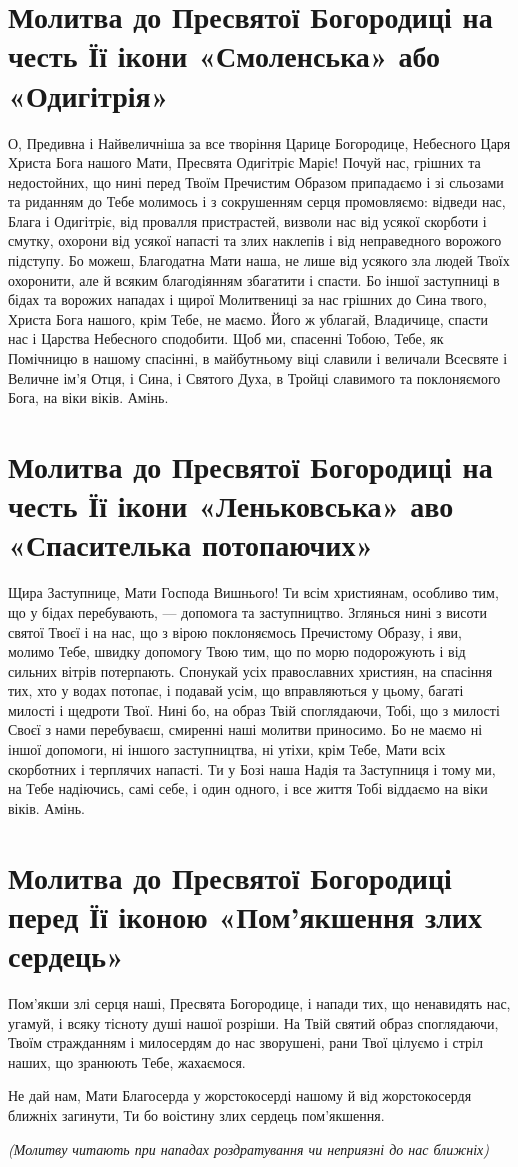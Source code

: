 \documentclass[chapters.tex]{subfiles}
\begin{document}
\section{Молитва до Пресвятої Богородиці на честь Її ікони «Смоленська» або «Одигітрія»}
О, Предивна і Найвеличніша за все творіння Царице Богородице, Небесного Царя Христа Бога нашого Мати, Пресвята Одигітріє Маріє! Почуй нас, грішних та недостойних, що нині перед Твоїм Пречистим Образом припадаємо і зі сльозами та риданням до Тебе молимось і з сокрушенням серця промовляємо: відведи нас, Блага і Одигітріє, від провалля пристрастей, визволи нас від усякої скорботи і смутку, охорони від усякої напасті та злих наклепів і від неправедного ворожого підступу. Бо можеш, Благодатна Мати наша, не лише від усякого зла людей Твоїх охоронити, але й всяким благодіянням збагатити і спасти. Бо іншої заступниці в бідах та ворожих нападах і щирої Молитвениці за нас грішних до Сина твого, Христа Бога нашого, крім Тебе, не маємо. Його ж ублагай, Владичице, спасти нас і Царства Небесного сподобити. Щоб ми, спасенні Тобою, Тебе, як Помічницю в нашому спасінні, в майбутньому віці славили і величали Всесвяте і Величне ім’я Отця, і Сина, і Святого Духа, в Тройці славимого та поклоняємого Бога, на віки віків. Амінь.

\section{Молитва до Пресвятої Богородиці на честь Її ікони «Леньковська» аво «Спасителька потопаючих»}
Щира Заступнице, Мати Господа Вишнього! Ти всім християнам, особливо тим, що у бідах перебувають, — допомога та заступництво. Зглянься нині з висоти святої Твоєї і на нас, що з вірою поклоняємось Пречистому Образу, і яви, молимо Тебе, швидку допомогу Твою тим, що по морю подорожують і від сильних вітрів потерпають. Спонукай усіх православних християн, на спасіння тих, хто у водах потопає, і подавай усім, що вправляються у цьому, багаті милості і щедроти Твої. Нині бо, на образ Твій споглядаючи, Тобі, що з милості Своєї з нами перебуваєш, смиренні наші молитви приносимо. Бо не маємо ні іншої допомоги, ні іншого заступництва, ні утіхи, крім Тебе, Мати всіх скорботних і терплячих напасті. Ти у Бозі наша Надія та Заступниця і тому ми, на Тебе надіючись, самі себе, і один одного, і все життя Тобі віддаємо на віки віків. Амінь.

\section{Молитва до Пресвятої Богородиці перед Її іконою «Пом’якшення злих сердець»}
Пом’якши злі серця наші, Пресвята Богородице, і напади тих, що ненавидять нас, угамуй, і всяку тісноту душі нашої розріши. На Твій святий образ споглядаючи, Твоїм стражданням і милосердям до нас зворушені, рани Твої цілуємо і стріл наших, що зранюють Тебе, жахаємося.

Не дай нам, Мати Благосерда у жорстокосерді нашому й від жорстокосердя ближніх загинути, Ти бо воістину злих сердець пом’якшення.

\emph{(Молитву читають при нападах роздратування чи неприязні до нас ближніх)}
\end{document}
